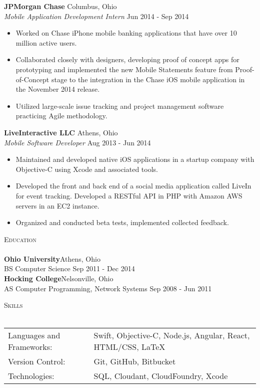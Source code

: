 \documentclass[a4paper]{article}
\newcommand{\lineunder} {
    \vspace*{-8pt} \\
    \hspace*{-18pt} \hrulefill \\
}
\newcommand{\header} [1] {
    {\hspace*{-18pt}\vspace*{6pt} \textsc{#1}}
    \vspace*{-6pt} \lineunder
}
\begin{document}
\vspace{1mm}
\textbf{JPMorgan Chase} \hfill Columbus, Ohio\\
\textit{Mobile Application Development Intern} \hfill Jun 2014 - Sep 2014\\
\vspace{-1mm}
\begin{itemize} \itemsep 1pt
	\item Worked on Chase iPhone mobile banking applications that have over 10 million active users. 
	\item Collaborated closely with designers, developing proof of concept apps for prototyping and implemented the new Mobile Statements feature from Proof-of-Concept stage to the integration in the Chase iOS mobile application in the November 2014 release.
	\item Utilized large-scale issue tracking and project management software practicing Agile methodology.
\end{itemize}
\vspace{1mm}
\textbf{LiveInteractive LLC} \hfill Athens, Ohio\\
\textit{Mobile Software Developer} \hfill Aug 2013 - Jun 2014\\
\vspace{-1mm}
\begin{itemize} \itemsep 1pt
	\item Maintained and developed native iOS applications in a startup company with Objective-C using Xcode and associated tools. 
	\item Developed the front and back end of a social media application called LiveIn for event tracking. Developed a RESTful API in PHP with Amazon AWS servers in an EC2 instance. 
	\item Organized and conducted beta tests, implemented collected feedback.
\end{itemize}


\header{Education}
\textbf{Ohio University}\hfill Athens, Ohio\\
BS Computer Science \hfill Sep 2011 - Dec 2014\\
\vspace{2mm}
\textbf{Hocking College}\hfill Nelsonville, Ohio\\
AS Computer Programming, Network Systems \hfill Sep 2008 - Jun 2011\\
\vspace{2mm}

\header{Skills}
\begin{tabular}{ l l }
	Languages and Frameworks: & Swift, Objective-C, Node.js, Angular, React, HTML/CSS, LaTeX\\
	Version Control:          & Git, GitHub, Bitbucket                                \\
	Technologies:             & SQL, Cloudant, CloudFoundry, Xcode                          \\
\end{tabular}
\end{document}
